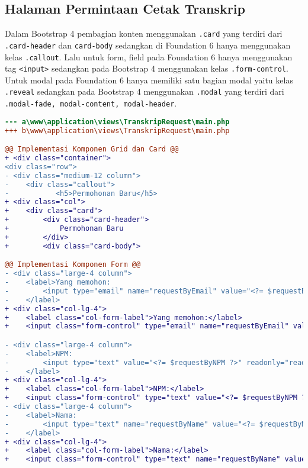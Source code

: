 \subsection{Halaman Permintaan Cetak Transkrip }
Dalam Bootstrap 4 pembagian konten menggunakan \texttt{.card} yang terdiri dari \texttt{.card-header} dan \texttt{card-body} sedangkan di Foundation 6 hanya menggunakan kelas \texttt{.callout}. Lalu untuk form, field pada Foundation 6 hanya menggunakan tag \texttt{<input>} sedangkan pada Bootstrap 4 menggunakan kelas \texttt{.form-control}.
Untuk modal pada Foundation 6 hanya memiliki satu bagian modal yaitu kelas \texttt{.reveal} sedangkan pada Bootstrap 4 menggunakan \texttt{.modal} yang terdiri dari \texttt{.modal-fade, modal-content, modal-header}.
\begin{lstlisting}[language=diff, caption=Perubahan file \path{\views\TranskripRequest\main.php}, label=Entri, basicstyle=\ttfamily, frame=single,
columns=fullflexible, keepspaces=true, breaklines=true]
--- a\www\application\views\TranskripRequest\main.php
+++ b\www\application\views\TranskripRequest\main.php

@@ Implementasi Komponen Grid dan Card @@
+ <div class="container">
<div class="row">
- <div class="medium-12 column">
-	 <div class="callout">
-    		<h5>Permohonan Baru</h5>
+ <div class="col">
+    <div class="card">
+        <div class="card-header">
+            Permohonan Baru
+        </div>
+        <div class="card-body">

@@ Implementasi Komponen Form @@
- <div class="large-4 column">
-    <label>Yang memohon:
-        <input type="email" name="requestByEmail" value="<?= $requestByEmail ?>" readonly="readonly"/>
-    </label>
+ <div class="col-lg-4">
+    <label class="col-form-label">Yang memohon:</label>
+    <input class="form-control" type="email" name="requestByEmail" value="<?= $requestByEmail ?>" readonly/>

- <div class="large-4 column">
-    <label>NPM:
-        <input type="text" value="<?= $requestByNPM ?>" readonly="readonly"/>
-    </label>
+ <div class="col-lg-4">
+    <label class="col-form-label">NPM:</label>
+    <input class="form-control" type="text" value="<?= $requestByNPM ?>" readonly/>
- <div class="large-4 column">
-    <label>Nama:
-        <input type="text" name="requestByName" value="<?= $requestByName ?>" readonly="readonly"/>
-    </label>
+ <div class="col-lg-4">
+    <label class="col-form-label">Nama:</label>
+    <input class="form-control" type="text" name="requestByName" value="<?= $requestByName ?>" 


\end{lstlisting}
